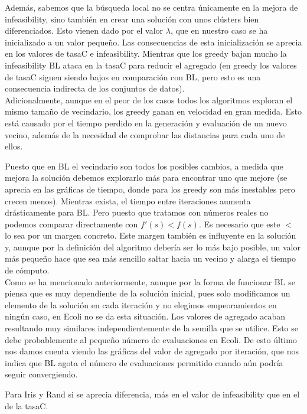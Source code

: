 Además, sabemos que la búsqueda local no se centra únicamente en la mejora de infeasibility, sino también en crear una solución con unos clústers bien diferenciados. Esto vienen dado por el valor $\lambda$, que en nuestro caso se ha inicializado a un valor pequeño. Las consecuencias de esta inicialización se aprecia en los valores de tasaC e infeasibility. Mientras que los greedy bajan mucho la infeasibility BL ataca en la tasaC para reducir el agregado (en greedy los valores de tasaC siguen siendo bajos en comparación con BL, pero esto es una consecuencia indirecta de los conjuntos de datos). \\

Adicionalmente, aunque en el peor de los casos todos los algoritmos exploran el mismo tamaño de vecindario, los greedy ganan en velocidad en gran medida. Esto está causado por el tiempo perdido en la generación y evaluación de un nuevo vecino, además de la necesidad de comprobar las distancias para cada uno de ellos.

Puesto que en BL el vecindario son todos los posibles cambios, a medida que mejora la solución debemos explorarlo más para encontrar uno que mejore (se aprecia en las gráficas de tiempo, donde para los greedy son más inestables pero crecen menos). Mientras exista, el tiempo entre iteraciones aumenta drásticamente para BL. Pero puesto que tratamos con números reales no podemos comparar directamente con $f'(s) < f(s)$. Es necesario que este $<$ lo sea por un margen concreto. Este margen también es influyente en la solución y, aunque por la definición del algoritmo debería ser lo más bajo posible, un valor más pequeño hace que sea más sencillo saltar hacia un vecino y alarga el tiempo de cómputo. \\

Como se ha mencionado anteriormente, aunque por la forma de funcionar BL se piensa que es muy dependiente de la solución inicial, pues solo modificamos un elemento de la solución en cada iteración y no elegimos empeoramientos en ningún caso, en Ecoli no se da esta situación. Los valores de agregado acaban resultando muy similares independientemente de la semilla que se utilice. Esto se debe probablemente al pequeño número de evaluaciones en Ecoli. De esto último nos damos cuenta viendo las gráficas del valor de agregado por iteración, que nos indica que BL agota el número de evaluaciones permitido cuando aún podría seguir convergiendo. 

Para Iris y Rand si se aprecia diferencia, más en el valor de infeasibility que en el de la tasaC.